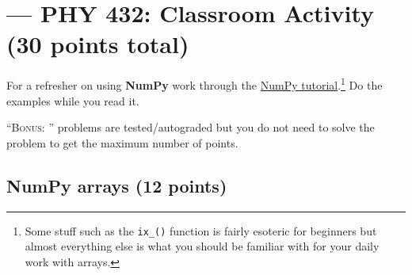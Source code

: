 \documentclass[letterpaper]{scrartcl}
\newcommand{\anumber}{4}
\newcommand{\BONUS}{\textsc{Bonus: }}
\begin{document}

\setcounter{section}{\anumber}
\addtocounter{section}{-1}
\section{ --- PHY 432: Classroom Activity (30 points total)}

\noindent For a refresher on using \textbf{NumPy} work through the
\href{https://numpy.org/doc/stable/user/quickstart.html}{NumPy
  tutorial}.\footnote{Some stuff such as the \texttt{ix\_()} function
  is fairly esoteric for beginners but almost everything else is what
  you should be familiar with for your daily work with arrays.} Do the
examples while you read it.

\noindent ``\BONUS'' problems are tested/autograded but you do not need to
solve the problem to get the maximum number of points.


\subsection{NumPy arrays (12 points)}
\end{document}
